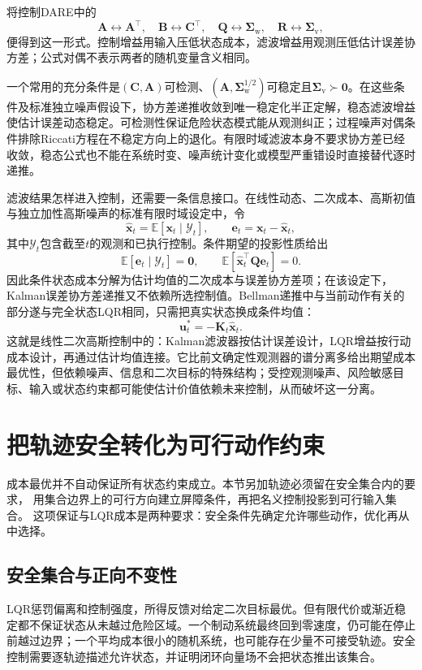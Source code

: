将控制DARE中的
\[
  \bm{A}\leftrightarrow\bm{A}^{\top},
  \quad
  \bm{B}\leftrightarrow\bm{C}^{\top},
  \quad
  \bm{Q}\leftrightarrow\bm{\Sigma}_{\mathrm{w}},
  \quad
  \bm{R}\leftrightarrow\bm{\Sigma}_{\mathrm{v}},
\]
便得到这一形式。控制增益用输入压低状态成本，滤波增益用观测压低估计误差协方差；公式对偶不表示两者的随机变量含义相同。

一个常用的充分条件是$(\bm{C},\bm{A})$可检测、$(\bm{A},\bm{\Sigma}_{\mathrm{w}}^{1/2})$可稳定且$\bm{\Sigma}_{\mathrm{v}}\succ\bm{0}$。在这些条件及标准独立噪声假设下，协方差递推收敛到唯一稳定化半正定解，稳态滤波增益使估计误差动态稳定。可检测性保证危险状态模式能从观测纠正；过程噪声对偶条件排除Riccati方程在不稳定方向上的退化。有限时域滤波本身不要求协方差已经收敛，稳态公式也不能在系统时变、噪声统计变化或模型严重错设时直接替代逐时递推。

滤波结果怎样进入控制，还需要一条信息接口。在线性动态、二次成本、高斯初值与独立加性高斯噪声的标准有限时域设定中，令
\[
  \widehat{\bm{x}}_t
  =
  \mathbb{E}[\bm{x}_t\mid\mathcal{Y}_t],
  \qquad
  \bm{e}_t=\bm{x}_t-\widehat{\bm{x}}_t,
\]
其中$\mathcal{Y}_t$包含截至$t$的观测和已执行控制。条件期望的投影性质给出
\[
  \mathbb{E}[\bm{e}_t\mid\mathcal{Y}_t]=\bm{0},
  \qquad
  \mathbb{E}
  [\widehat{\bm{x}}_t^{\top}\bm{Q}\bm{e}_t]=0.
\]
因此条件状态成本分解为估计均值的二次成本与误差协方差项；在该设定下，Kalman误差协方差递推又不依赖所选控制值。Bellman递推中与当前动作有关的部分遂与完全状态LQR相同，只需把真实状态换成条件均值：
\[
  \bm{u}_t^{\ast}
  =
  -\bm{K}_t\widehat{\bm{x}}_t.
\]
这就是线性二次高斯控制中的：Kalman滤波器按估计误差设计，LQR增益按行动成本设计，再通过估计均值连接。它比前文确定性观测器的谱分离多给出期望成本最优性，但依赖噪声、信息和二次目标的特殊结构；受控观测噪声、风险敏感目标、输入或状态约束都可能使估计价值依赖未来控制，从而破坏这一分离。
\section{把轨迹安全转化为可行动作约束}
\label{sec:control-safety-cbf}

成本最优并不自动保证所有状态约束成立。本节另加轨迹必须留在安全集合内的要求，
用集合边界上的可行方向建立屏障条件，再把名义控制投影到可行输入集合。
这项保证与LQR成本是两种要求：安全条件先确定允许哪些动作，优化再从中选择。
\subsection{安全集合与正向不变性}
LQR惩罚偏离和控制强度，所得反馈对给定二次目标最优。但有限代价或渐近稳定都不保证状态从未越过危险区域。一个制动系统最终回到零速度，仍可能在停止前越过边界；一个平均成本很小的随机系统，也可能存在少量不可接受轨迹。安全控制需要逐轨迹描述允许状态，并证明闭环向量场不会把状态推出该集合。

